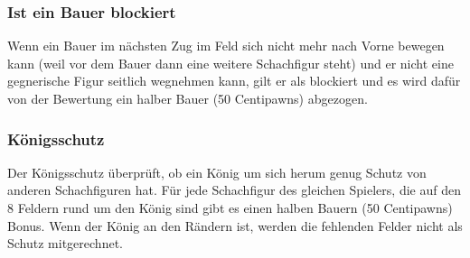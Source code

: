\subsubsection{Ist ein Bauer blockiert}
Wenn ein Bauer im nächsten Zug im Feld sich nicht mehr nach Vorne bewegen kann (weil vor dem Bauer dann eine weitere Schachfigur steht) und er nicht eine gegnerische Figur seitlich wegnehmen kann, gilt er als blockiert und es wird dafür von der Bewertung ein halber Bauer (50 Centipawns) abgezogen.

\subsubsection{Königsschutz}
Der Königsschutz überprüft, ob ein König um sich herum genug Schutz von anderen Schachfiguren hat.\newline
F\"ur jede Schachfigur des gleichen Spielers, die auf den 8 Feldern rund um den K\"onig sind gibt es einen halben Bauern (50 Centipawns) Bonus. Wenn der K\"onig an den R\"andern ist, werden die fehlenden Felder nicht als Schutz mitgerechnet.
